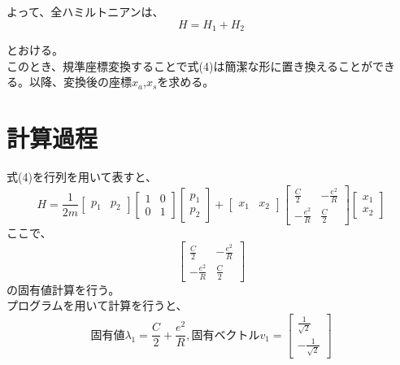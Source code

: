 \documentclass{jsarticle}
\begin{document}
	よって、全ハミルトニアンは、
		\begin{equation}
			H=H_{1}+H_{2}
		\end{equation}

	とおける。\\
	このとき、規準座標変換することで式(4)は簡潔な形に置き換えることができる。以降、変換後の座標$x_a$,$x_s$を求める。

	\section{計算過程}
	式(4)を行列を用いて表すと、
	\begin{equation}
		H=\frac{1}{2m}
		\begin{bmatrix}
		p_1 & p_2
		\end{bmatrix}
		\begin{bmatrix}
			1 & 0 \\
			0 & 1
		\end{bmatrix}
		\begin{bmatrix}
			p_1 \\
			p_2
		\end{bmatrix}
		+
		\begin{bmatrix}
		x_1 & x_2
		\end{bmatrix}
		\begin{bmatrix}
		\frac{C}{2} & -\frac{e^{2}}{R} \\
		-\frac{e^{2}}{R} & \frac{C}{2}
		\end{bmatrix}
		\begin{bmatrix}
		x_1 \\
		x_2
		\end{bmatrix}
	\end{equation}
	ここで、
	\begin{equation}
	\begin{bmatrix}
	\frac{C}{2} & -\frac{e^{2}}{R} \\
	-\frac{e^{2}}{R} & \frac{C}{2}
	\end{bmatrix}
	\end{equation}
	の固有値計算を行う。\\
	プログラムを用いて計算を行うと、
	\begin{equation}
	固有値 \lambda_1 = \frac{C}{2}+\frac{e^{2}}{R},
	固有ベクトル v_1=
	\begin{bmatrix}
	\frac{1}{\sqrt{2}} \\
	-\frac{1}{\sqrt{2}}
	\end{bmatrix}
	\end{equation}
\end{document}
